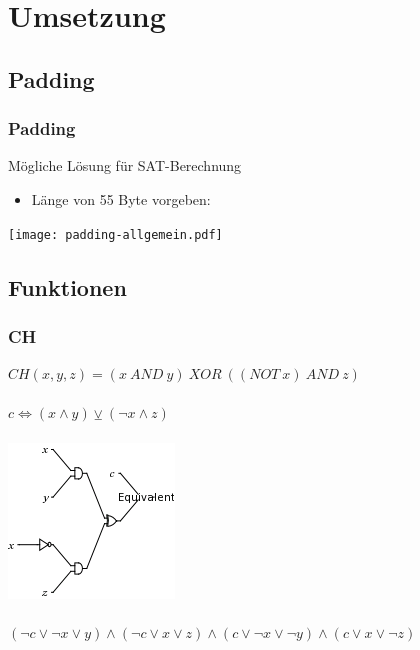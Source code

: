 \documentclass{beamer}
\begin{document}
\section{Umsetzung}
  \subsection{Padding}
    \begin{frame}
      \frametitle{Padding}
      Mögliche Lösung für SAT-Berechnung\\
      \begin{itemize}
       \item Länge von 55 Byte vorgeben:
      \end{itemize}
      \texttt{[image: padding-allgemein.pdf]}
    \end{frame}
  \subsection{Funktionen}
    \begin{frame}
      \frametitle{CH}
      $ CH( x, y, z) = (x~AND~y)~XOR~( (NOT~x)~AND~z) $\\
      ~\\
      $ c \Leftrightarrow (x \wedge y) \veebar ( \neg x \wedge z) $\\
      ~\\
      \includegraphics[scale=0.5]{ch.png}\\
      ~\\
      $ (\neg c \vee \neg x \vee y) \wedge (\neg c \vee x \vee z) \wedge (c \vee \neg x \vee \neg y) \wedge (c \vee x \vee \neg z) $
    \end{frame}
\end{document}
